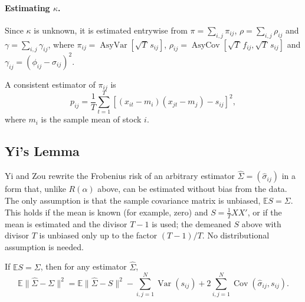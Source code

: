 \paragraph{Estimating $\kappa$.}
Since $\kappa$ is unknown, it is estimated entrywise from $\pi = \sum_{i,j} \pi_{ij}$, $\rho = \sum_{i,j} \rho_{ij}$ and $\gamma = \sum_{i,j} \gamma_{ij}$, where $\pi_{ij} = \operatorname{AsyVar}[\sqrt{T}\, s_{ij}]$, $\rho_{ij} = \operatorname{AsyCov}[\sqrt{T}\, f_{ij}, \sqrt{T}\, s_{ij}]$ and $\gamma_{ij} = (\phi_{ij} - \sigma_{ij})^2$.

\begin{lemma}
A consistent estimator of $\pi_{ij}$ is
\[
  p_{ij} = \frac{1}{T} \sum_{t=1}^T \left[ (x_{it} - m_i)(x_{jt} - m_j) - s_{ij} \right]^2,
\]
where $m_i$ is the sample mean of stock $i$.
\end{lemma}

\subsection{Yi's Lemma}

Yi and Zou rewrite the Frobenius risk of an arbitrary estimator $\hat\Sigma = (\hat\sigma_{ij})$ in a form that, unlike $R(\alpha)$ above, can be estimated without bias from the data. The only assumption is that the sample covariance matrix is unbiased, $\mathbb{E} S = \Sigma$. This holds if the mean is known (for example, zero) and $S = \frac{1}{T} X X'$, or if the mean is estimated and the divisor $T-1$ is used; the demeaned $S$ above with divisor $T$ is unbiased only up to the factor $(T-1)/T$. No distributional assumption is needed.

\begin{lemma}\label{lem:yi}
If $\mathbb{E} S = \Sigma$, then for any estimator $\hat\Sigma$,
\[
  \mathbb{E}\|\hat\Sigma - \Sigma\|^2
  = \mathbb{E}\|\hat\Sigma - S\|^2
  - \sum_{i,j=1}^N \operatorname{Var}(s_{ij})
  + 2\sum_{i,j=1}^N \operatorname{Cov}(\hat\sigma_{ij}, s_{ij}).
\]
\end{lemma}

